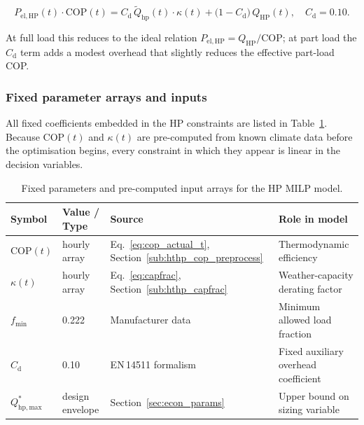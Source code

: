 \documentclass[11pt,a4paper]{report}
\begin{document}
\begin{equation}
    P_\mathrm{el,HP}(t)\cdot\mathrm{COP}(t)
    = C_\mathrm{d}\,\tilde{Q}_\mathrm{hp}(t)\cdot\kappa(t)
      + \bigl(1-C_\mathrm{d}\bigr)\,Q_\mathrm{HP}(t),
    \quad C_\mathrm{d} = 0.10.
    \label{eq:hthp_power}
\end{equation}

\noindent At full load this reduces to the ideal relation
$P_\mathrm{el,HP} = Q_\mathrm{HP}/\mathrm{COP}$; at part load the $C_\mathrm{d}$
term adds a modest overhead that slightly reduces the effective part-load COP.

\subsubsection{Fixed parameter arrays and inputs}
\label{sub:hthp_params}

All fixed coefficients embedded in the HP constraints are listed in
Table~\ref{tab:hthp_inputs}.
Because $\mathrm{COP}(t)$ and $\kappa(t)$ are pre-computed from known climate data
before the optimisation begins, every constraint in which they appear is linear in the
decision variables.

\begin{table}[H]
\centering
\caption{Fixed parameters and pre-computed input arrays for the HP MILP model.}
\label{tab:hthp_inputs}
\begin{tabular}{lllp{5cm}}
\hline
\textbf{Symbol} & \textbf{Value / Type} & \textbf{Source} & \textbf{Role in model} \\
\hline
$\mathrm{COP}(t)$ & hourly array & Eq.~\eqref{eq:cop_actual_t}, Section~\ref{sub:hthp_cop_preprocess}
    & Thermodynamic efficiency \\
$\kappa(t)$ & hourly array & Eq.~\eqref{eq:capfrac}, Section~\ref{sub:hthp_capfrac}
    & Weather-capacity derating factor \\
$f_\mathrm{min}$ & 0.222 & Manufacturer data
    & Minimum allowed load fraction \\
$C_\mathrm{d}$ & 0.10 & EN\,14511 formalism
    & Fixed auxiliary overhead coefficient \\
$Q_\mathrm{hp,max}^{*}$ & design envelope & Section~\ref{sec:econ_params}
    & Upper bound on sizing variable \\
\hline
\end{tabular}
\end{table}
\end{document}
